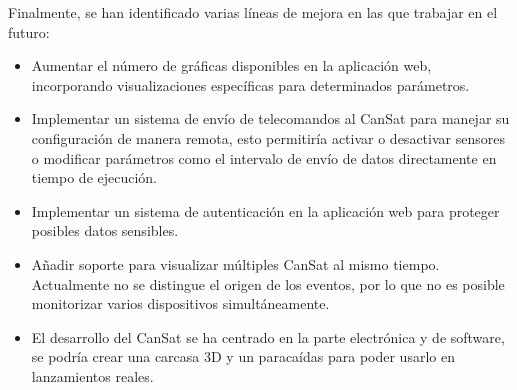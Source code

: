 Finalmente, se han identificado varias líneas de mejora en las que trabajar en el 
futuro:

\begin{itemize}
    \item Aumentar el número de gráficas disponibles en la aplicación web, incorporando visualizaciones específicas para determinados parámetros.
    \item Implementar un sistema de envío de telecomandos al CanSat para manejar su configuración de manera remota, esto permitiría activar o desactivar sensores o modificar parámetros como el intervalo de envío de datos directamente en tiempo de ejecución.
    \item Implementar un sistema de autenticación en la aplicación web para proteger posibles datos sensibles.
    \item Añadir soporte para visualizar múltiples CanSat al mismo tiempo. Actualmente no se distingue el origen de los eventos, por lo que no es posible monitorizar varios dispositivos simultáneamente.
    \item El desarrollo del CanSat se ha centrado en la parte electrónica y de software, se podría crear una carcasa 3D y un paracaídas para poder usarlo en lanzamientos reales.
\end{itemize}








